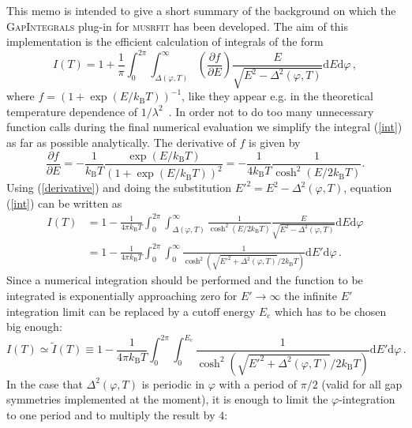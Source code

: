 \documentclass[twoside]{article}
\newcommand{\musrfit}{\textsc{musrfit}\xspace}
\newcommand{\gapint}{\textsc{GapIntegrals}\xspace}
\begin{document}
This memo is intended to give a short summary of the background on which the \gapint plug-in for \musrfit \cite{musrfit} has been developed. The aim of this implementation is the efficient calculation of integrals of the form
\begin{equation}\label{int}
 I(T) = 1 + \frac{1}{\pi}\int_0^{2\pi}\int_{\Delta(\varphi,T)}^{\infty}\left(\frac{\partial f}{\partial E}\right) \frac{E}{\sqrt{E^2-\Delta^2(\varphi,T)}}\mathrm{d}E\mathrm{d}\varphi\,,
\end{equation}
where $f = (1+\exp(E/k_{\mathrm B}T))^{-1}$, like they appear e.g. in the theoretical temperature dependence of $1/\lambda^2$~\cite{Manzano}.
In order not to do too many unnecessary function calls during the final numerical evaluation we simplify the integral (\ref{int}) as far as possible analytically. The derivative of $f$ is given by
\begin{equation}\label{derivative}
\frac{\partial f}{\partial E} = -\frac{1}{k_{\mathrm B}T}\frac{\exp(E/k_{\mathrm B}T)}{\left(1+\exp(E/k_{\mathrm B}T)\right)^2} = -\frac{1}{4k_{\mathrm B}T} \frac{1}{\cosh^2\left(E/2k_{\mathrm B}T\right)}.
\end{equation}
Using (\ref{derivative}) and doing the substitution $E'^2 = E^2-\Delta^2(\varphi,T)$, equation (\ref{int}) can be written as
\begin{equation}
\begin{split}
I(T) & = 1 - \frac{1}{4\pi k_{\mathrm B}T}\int_0^{2\pi}\int_{\Delta(\varphi,T)}^{\infty}\frac{1}{\cosh^2\left(E/2k_{\mathrm B}T\right)}\frac{E}{\sqrt{E^2-\Delta^2(\varphi,T)}}\mathrm{d}E\mathrm{d}\varphi \\
& = 1 - \frac{1}{4\pi k_{\mathrm B}T}\int_0^{2\pi}\int_{0}^{\infty}\frac{1}{\cosh^2\left(\sqrt{E'^2+\Delta^2(\varphi,T)}/2k_{\mathrm B}T\right)}\mathrm{d}E'\mathrm{d}\varphi\,.
\end{split}
\end{equation}
Since a numerical integration should be performed and the function to be integrated is exponentially approaching zero for $E'\rightarrow\infty$ the infinite $E'$ integration limit can be replaced by a cutoff energy $E_{\mathrm c}$ which has to be chosen big enough:
\begin{equation}
I(T) \simeq \tilde{I}(T) \equiv 1 - \frac{1}{4\pi k_{\mathrm B}T}\int_0^{2\pi}\int_{0}^{E_{\mathrm c}}\frac{1}{\cosh^2\left(\sqrt{E'^2+\Delta^2(\varphi,T)}/2k_{\mathrm B}T\right)}\mathrm{d}E'\mathrm{d}\varphi\,.
\end{equation}
In the case that $\Delta^2(\varphi,T)$ is periodic in $\varphi$ with a period of $\pi/2$ (valid for all gap symmetries implemented at the moment), it is enough to limit the $\varphi$-integration to one period and to multiply the result by $4$:
\end{document}
